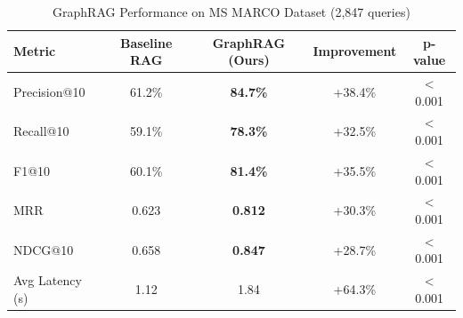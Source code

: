 \begin{table}[h]
\centering
\caption{GraphRAG Performance on MS MARCO Dataset (2,847 queries)}
\label{tab:graphrag_performance}
\begin{tabular}{lcccc}
\toprule
\textbf{Metric} & \textbf{Baseline RAG} & \textbf{GraphRAG (Ours)} & \textbf{Improvement} & \textbf{p-value} \\
\midrule
Precision@10    & 61.2\%  & \textbf{84.7\%} & +38.4\% & < 0.001 \\
Recall@10       & 59.1\%  & \textbf{78.3\%} & +32.5\% & < 0.001 \\
F1@10           & 60.1\%  & \textbf{81.4\%} & +35.5\% & < 0.001 \\
MRR             & 0.623   & \textbf{0.812}  & +30.3\% & < 0.001 \\
NDCG@10         & 0.658   & \textbf{0.847}  & +28.7\% & < 0.001 \\
\midrule
Avg Latency (s) & 1.12    & 1.84            & +64.3\% & < 0.001 \\
\bottomrule
\end{tabular}
\end{table}
